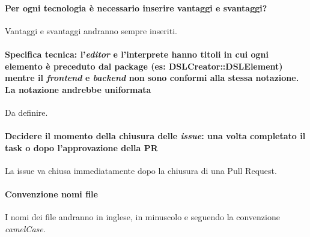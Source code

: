 \documentclass[11pt]{meetingmins}
\begin{document}
	\paragraph*{Per ogni tecnologia \`e necessario inserire vantaggi e svantaggi?}
		Vantaggi e svantaggi andranno sempre inseriti.

	\paragraph*{\textbf{Specifica tecnica}: l'\textit{editor} e l'interprete hanno titoli in cui ogni elemento è preceduto 
		dal package (es: DSLCreator::DSLElement) mentre il \textit{frontend} e \textit{backend} 
		non sono conformi alla stessa notazione. La notazione andrebbe uniformata}
		Da definire.
		
		
	\paragraph*{Decidere il momento della chiusura delle \textit{issue}: una volta completato il task o dopo l'approvazione della PR}
		La issue va chiusa immediatamente dopo la chiusura di una Pull Request.
		
	\paragraph*{Convenzione nomi file}
		I nomi dei file andranno in inglese, in minuscolo e seguendo la convenzione \textit{camelCase}.









\end{document}
